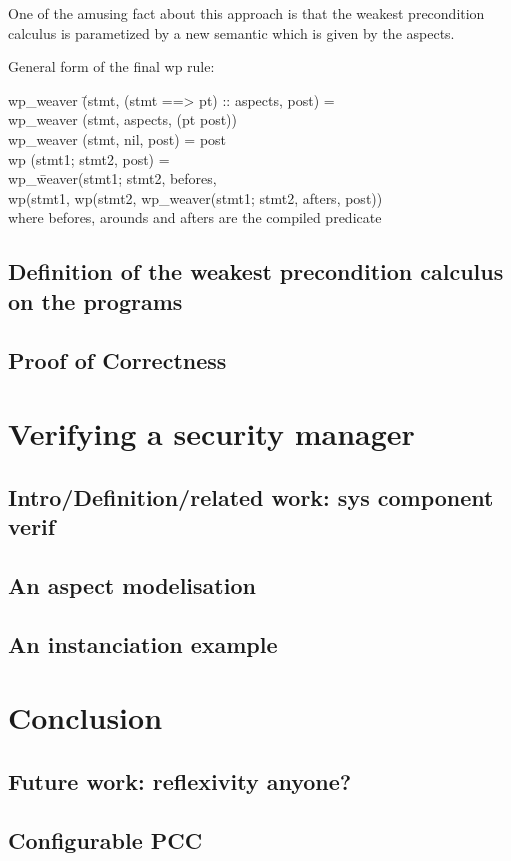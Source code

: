 \documentclass[draft]{llncs}
\begin{document}
One of the amusing fact about this approach is that the weakest precondition calculus is parametized by a new 
semantic which is given by the aspects.

General form of the final wp rule:
\bcode

wp\_weaver \= (stmt, (stmt ==> pt) :: aspects, post) = \\
\>wp\_weaver (stmt, aspects, (pt post))\\
wp\_weaver (stmt, nil, post) =  post\\

wp (stmt1; stmt2, post) = \\
\> wp\_\=weaver(stmt1; stmt2, befores, \\
 \>\>      wp(stmt1, wp(stmt2, wp\_weaver(stmt1; stmt2, afters, post))\\
\ecode
where befores, arounds and afters are the compiled predicate
\subsection{Definition of the weakest precondition calculus on the programs}
\subsection{Proof of Correctness}
%
\section{Verifying a security manager}
\subsection{Intro/Definition/related work: sys component verif}
\subsection{An aspect modelisation}
\subsection{An instanciation example}
\section{Conclusion}
\subsection{Future work: reflexivity anyone?}
\subsection{Configurable PCC}
%
%
\begin{thebibliography}{}
%


\end{thebibliography}
\end{document}
